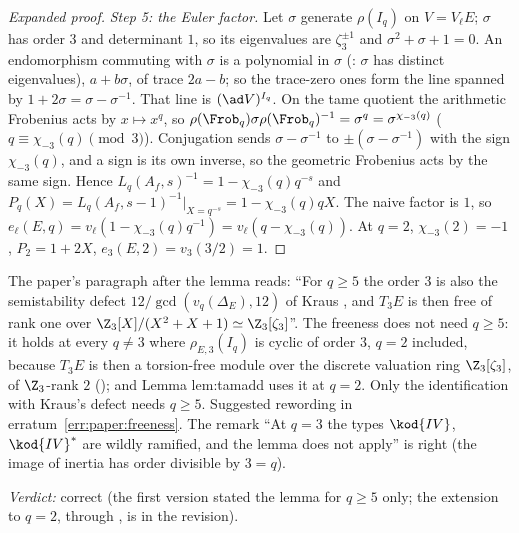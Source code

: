\begin{sloppypar}
\begin{proof}[Expanded proof]
\emph{Step 5: the Euler factor.} Let $\sigma$ generate $\rho(I_q)$ on $V=V_\ell E$; $\sigma$ has order $3$ and determinant $1$, so its eigenvalues are $\zeta_3^{\pm1}$ and $\sigma^2+\sigma+1=0$.
An endomorphism commuting with $\sigma$ is a polynomial in $\sigma$ (: $\sigma$ has distinct eigenvalues), $a+b\sigma$, of trace $2a-b$; so the trace-zero ones
form the line spanned by $1+2\sigma=\sigma-\sigma^{-1}$. That line is $(\ad V)^{I_q}$. On the tame quotient the arithmetic Frobenius acts by $x\mapsto x^q$, so
$\rho(\Frob_q)\sigma\rho(\Frob_q)^{-1}=\sigma^q=\sigma^{\chi_{-3}(q)}$ ($q\equiv\chi_{-3}(q)\pmod3$). Conjugation sends $\sigma-\sigma^{-1}$ to $\pm(\sigma-\sigma^{-1})$ with the sign $\chi_{-3}(q)$, and a sign
is its own inverse, so the geometric Frobenius acts by the same sign. Hence $L_q(A_f,s)^{-1}=1-\chi_{-3}(q)q^{-s}$ and $P_q(X)=L_q(A_f,s-1)^{-1}|_{X=q^{-s}}=1-\chi_{-3}(q)qX$. The naive factor
is $1$, so $e_\ell(E,q)=v_\ell(1-\chi_{-3}(q)q^{-1})=v_\ell(q-\chi_{-3}(q))$. At $q=2$, $\chi_{-3}(2)=-1$, $P_2=1+2X$, $e_3(E,2)=v_3(3/2)=1$.
\end{proof}

\begin{warning}[Commentary]\label{warn:paper:IV}
The paper's paragraph after the lemma reads: ``For $q\ge5$ the order $3$ is also the semistability defect $12/\gcd(v_q(\Delta_E),12)$ of Kraus \cite{Kraus90}, and $T_3E$ is
then free of rank one over $\Z_3[X]/(X^2+X+1)\simeq\Z_3[\zeta_3]$''. The freeness does not need $q\ge5$: it holds at every $q\ne3$ where $\rho_{E,3}(I_q)$ is cyclic of order $3$,
$q=2$ included, because $T_3E$ is then a torsion-free module over the discrete valuation ring $\Z_3[\zeta_3]$, of $\Z_3$-rank $2$ (); and Lemma lem:tamadd uses it at
$q=2$. Only the identification with Kraus's defect needs $q\ge5$. Suggested rewording in erratum~\ref{err:paper:freeness}. The remark ``At $q=3$ the types $\kod{IV}$, $\kod{IV}^*$
are wildly ramified, and the lemma does not apply'' is right (the image of inertia has order divisible by $3=q$).
\end{warning}

\noindent\emph{Verdict:} correct (the first version stated the lemma for $q\ge5$ only; the extension to $q=2$, through , is in the revision).


\end{sloppypar}
